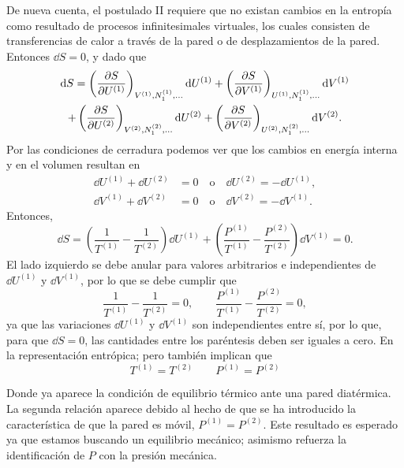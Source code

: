 De nueva cuenta, el postulado II requiere que no existan cambios en la entropía como resultado de
procesos infinitesimales virtuales, los cuales consisten de transferencias de calor a través de la
pared o de desplazamientos de la pared. Entonces $\dd S=0$, y dado que
\begin{multline*}
  \dd S=\left(\frac{\partial S}{\partial U^{(1)}}\right)_{V^{(1)},N_1^{(1)},\dots}\dd U^{(1)}+\left(\frac{\partial S}{\partial V^{(1)}}\right)_{U^{(1)},N_1^{(1)},\dots}\dd V^{(1)}\\
  +\left(\frac{\partial S}{\partial U^{(2)}}\right)_{V^{(2)},N_1^{(2)},\dots}\dd U^{(2)}+\left(\frac{\partial S}{\partial V^{(2)}}\right)_{U^{(2)},N_1^{(2)},\dots}\dd V^{(2)}.
\end{multline*}
Por las condiciones de cerradura podemos ver que los cambios en energía interna y en el volumen
resultan en
\begin{align*}
  \dd U^{(1)}+\dd U^{(2)}&=0\quad\text{o}\quad\dd U^{(2)}=-\dd U^{(1)},\\
  \dd V^{(1)}+\dd V^{(2)}&=0\quad\text{o}\quad\dd V^{(2)}=-\dd V^{(1)}.
\end{align*}
Entonces,
\begin{equation*}
  \dd S=\left(\frac{1}{T^{(1)}}-\frac{1}{T^{(2)}}\right)\dd U^{(1)}+\left(\frac{P^{(1)}}{T^{(1)}}-\frac{P^{(2)}}{T^{(2)}}\right)\dd V^{(1)}=0.
\end{equation*}
El lado izquierdo se debe anular para valores arbitrarios e independientes de $\dd U^{(1)}$ y
$\dd V^{(1)}$, por lo que se debe cumplir que
\begin{equation*}
  \frac{1}{T^{(1)}}-\frac{1}{T^{(2)}}=0,\qquad\frac{P^{(1)}}{T^{(1)}}-\frac{P^{(2)}}{T^{(2)}}=0,
\end{equation*}
ya que las variaciones $\dd U^{(1)}$ y $\dd V^{(1)}$ son independientes entre sí, por lo que, para
que $\dd S=0$, las cantidades entre los paréntesis deben ser iguales a cero. En la representación
entrópica; pero también implican que
\begin{equation*}
  \boxed{T^{(1)}=T^{(2)}}\qquad\boxed{P^{(1)}=P^{(2)}}
\end{equation*}

Donde ya aparece la condición de equilibrio térmico ante una pared diatérmica. La segunda relación
aparece debido al hecho de que se ha introducido la característica de que la pared es móvil,
$P^{(1)}=P^{(2)}$. Este resultado es esperado ya que estamos buscando un equilibrio mecánico;
asimismo refuerza la identificación de $P$ con la presión mecánica.

